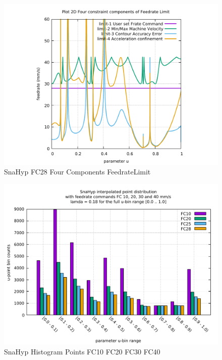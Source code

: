 \begin{figure}
	\caption     {SnaHyp FC28 Four Components FeedrateLimit}
	\label{34-img-SnaHyp-FC28-Four-Components-FeedrateLimit.pdf}
\includegraphics[width=1.00\textwidth]{Chap4/appendix/app-SnaHyp/plots/34-img-SnaHyp-FC40-Four-Components-FeedrateLimit.pdf}
\end{figure}


\clearpage
\pagebreak

\begin{figure}
	\centering
	\caption     {SnaHyp Histogram Points FC10 FC20 FC30 FC40}
	\label{35-img-SnaHyp-Histogram-Points-FC10-FC20-FC30-FC40.pdf}
\includegraphics[width=1.00\textwidth]{Chap4/appendix/app-SnaHyp/plots/35-img-SnaHyp-Histogram-Points-FC10-FC20-FC30-FC40.pdf} 
\end{figure}


